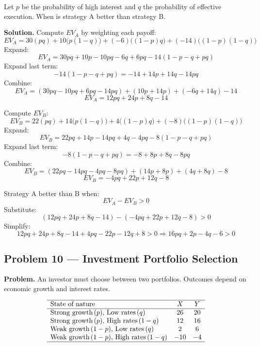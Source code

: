 \begin{ExamProblems}
		Let \(p\) be the probability of high interest and \(q\) the probability of effective execution.  
		When is strategy A better than strategy B.
		
		\textbf{Solution.}
		Compute \(EV_A\) by weighting each payoff:
		\[
		EV_A=30(pq)+10\bigl(p(1-q)\bigr)+(-6)\bigl((1-p)q\bigr)+(-14)\bigl((1-p)(1-q)\bigr)
		\]
		Expand:
		\[
		EV_A=30pq + 10p - 10pq - 6q + 6pq - 14(1-p-q+pq)
		\]
		Expand last term:
		\[
		-14(1-p-q+pq)=-14 + 14p + 14q - 14pq
		\]
		Combine:
		\[
		EV_A=(30pq-10pq+6pq-14pq) + (10p+14p) + (-6q+14q) - 14
		\]
		\[
		EV_A=12pq + 24p + 8q - 14
		\]
		
		Compute \(EV_B\):
		\[
		EV_B=22(pq)+14\bigl(p(1-q)\bigr)+4\bigl((1-p)q\bigr)+(-8)\bigl((1-p)(1-q)\bigr)
		\]
		Expand:
		\[
		EV_B=22pq + 14p - 14pq + 4q - 4pq - 8(1-p-q+pq)
		\]
		Expand last term:
		\[
		-8(1-p-q+pq)=-8 + 8p + 8q - 8pq
		\]
		Combine:
		\[
		EV_B=(22pq-14pq-4pq-8pq) + (14p+8p) + (4q+8q) - 8
		\]
		\[
		EV_B=-4pq + 22p + 12q - 8
		\]
		
		Strategy A better than B when:
		\[
		EV_A-EV_B>0
		\]
		Substitute:
		\[
		(12pq+24p+8q-14)-(-4pq+22p+12q-8)>0
		\]
		Simplify:
		\[
		12pq+24p+8q-14+4pq-22p-12q+8>0
		\Rightarrow 16pq+2p-4q-6>0
		\]
		
		
		\hypertarget{c7-ex10}{}
		\item
		\subsection*{Problem 10 — Investment Portfolio Selection}
		
		\textbf{Problem.}
		An investor must choose between two portfolios. Outcomes depend on economic growth
		and interest rates.
		
		\[
		\begin{array}{lcc}
			\hline
			\text{State of nature} & X & Y \\
			\hline
			\text{Strong growth}\,(p),\,\text{Low rates}\,(q) & 26 & 20 \\
			\text{Strong growth}\,(p),\,\text{High rates}\,(1-q) & 12 & 16 \\
			\text{Weak growth}\,(1-p),\,\text{Low rates}\,(q) & 2 & 6 \\
			\text{Weak growth}\,(1-p),\,\text{High rates}\,(1-q) & -10 & -4 \\
			\hline
		\end{array}
		\]
		

\end{ExamProblems}
